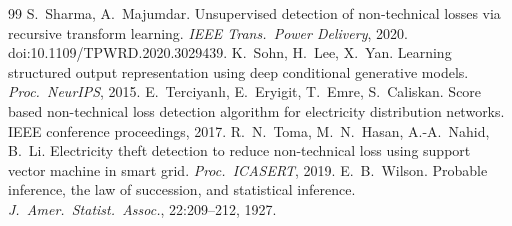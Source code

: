 \documentclass[11pt,a4paper]{article}
\theoremstyle{plain}
\theoremstyle{definition}
\theoremstyle{remark}
\begin{document}
\begin{thebibliography}{99}
 S.~Sharma, A.~Majumdar. Unsupervised detection of non-technical losses via recursive transform learning. \emph{IEEE Trans.\ Power Delivery}, 2020. doi:10.1109/TPWRD.2020.3029439.
 K.~Sohn, H.~Lee, X.~Yan. Learning structured output representation using deep conditional generative models. \emph{Proc.\ NeurIPS}, 2015.
 E.~Terciyanl\i{}, E.~Eryigit, T.~Emre, S.~Caliskan. Score based non-technical loss detection algorithm for electricity distribution networks. IEEE conference proceedings, 2017.
 R.~N.~Toma, M.~N.~Hasan, A.-A.~Nahid, B.~Li. Electricity theft detection to reduce non-technical loss using support vector machine in smart grid. \emph{Proc.\ ICASERT}, 2019.
 E.~B.~Wilson. Probable inference, the law of succession, and statistical inference. \emph{J.\ Amer.\ Statist.\ Assoc.}, 22:209--212, 1927.
\end{thebibliography}
\end{document}
